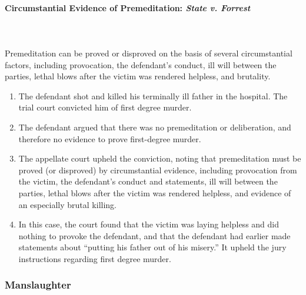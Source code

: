 \paragraph{Circumstantial Evidence of Premeditation: \emph{State v. Forrest}}
~\\\\
Premeditation can be proved or disproved on the basis of several 
circumstantial factors, including provocation, the defendant's conduct, ill 
will between the parties, lethal blows after the victim was rendered helpless, 
and brutality.

\begin{enumerate}
    \item The defendant shot and killed his terminally ill father in the 
    hospital. The trial court convicted him of first degree murder.
    \item The defendant argued that there was no premeditation or 
    deliberation, and therefore no evidence to prove first-degree murder.
    \item The appellate court upheld the conviction, noting that premeditation 
    must be proved (or disproved) by circumstantial evidence, including 
    provocation from the victim, the defendant's conduct and statements, ill 
    will between the parties, lethal blows after the victim was rendered 
    helpless, and evidence of an especially brutal killing.
    \item In this case, the court found that the victim was laying helpless 
    and did nothing to provoke the defendant, and that the defendant had 
    earlier made statements about ``putting his father out of his misery.'' It 
    upheld the jury instructions regarding first degree murder.
\end{enumerate}

\subsubsection{Manslaughter}


